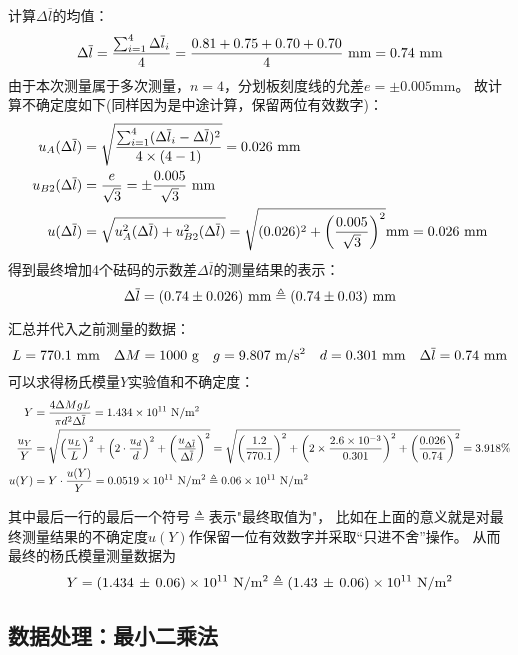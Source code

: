 \documentclass[11pt]{article}
\begin{document}
计算$\Delta \overline l$的均值：
\[
   \Delta \overline l=\frac{\sum_{i=1}^4\Delta \overline l_i}{4}=\frac{0.81+0.75+0.70+0.70}{4}\,\,{\rm mm}=0.74 \,\, {\rm mm} 
\]
由于本次测量属于多次测量，$n=4$，分划板刻度线的允差$e=\pm 0.005$mm。
故计算不确定度如下(同样因为是中途计算，保留两位有效数字)：
\begin{align*}
     u_A(\Delta \overline l)&=\sqrt{\frac{\sum_{i=1}^4(\Delta \overline l_i-\Delta \overline l)^2}{4\times(4-1)}}=0.026\,\,{\rm mm}\\
     u_{B2}(\Delta \overline l)&=\frac{e}{\sqrt 3}=\pm \frac{0.005}{\sqrt 3} \,\,{\rm mm}\\
     u(\Delta \overline l)&=
    \sqrt{u_{A}^2(\Delta \overline l)+u^2_{B2}(\Delta \overline l)} =\sqrt{(0.026)^2+\left(\frac{0.005}{\sqrt3 }\right)^2}{\rm mm}
    =0.026 \,\,{\rm mm}
\end{align*}
得到最终增加4个砝码的示数差$\Delta \overline l$的测量结果的表示：
\[
   \Delta \overline l= (0.74\pm 0.026)\,\,{\rm mm}\triangleq (0.74\pm 0.03)\,\,{\rm mm}
\]


汇总并代入之前测量的数据：
\[
    L=770.1\,\,{\rm mm} \quad \Delta M=1000\,\,{\rm g}\quad 
    g=9.807\,\,{\rm m/s^2}\quad d=0.301\,\,{\rm mm}
    \quad  \Delta\overline l=0.74\,\,{\rm mm}
\]
可以求得杨氏模量$Y$实验值和不确定度：
\begin{align*}
     Y&=\frac{4\Delta M gL}{\pi d^2\Delta \overline l}=1.434\times 10^{11}\,\,{\rm N/m^2}\\
    \frac{u_Y}{Y}&=\sqrt{\left(\frac{u_L}{L}\right)^2
    +\left(2\cdot\frac{u_d}{d}\right)^2+\left(\frac{u_{\Delta \overline l}}{\Delta \overline l}\right)^2}
    =\sqrt{\left(\frac{1.2}{770.1}\right)^2
    +\left(2\times\frac{ 2.6\times 10^{-3}}{0.301}\right)^2+\left(\frac{0.026}{0.74}\right)^2}=3.918\%
    \\ u(Y)&=Y\cdot\frac{u(Y)}{Y}=0.0519\times 10^{11}\,\,{\rm N/m^2}\triangleq0.06\times10^{11}\,\,{\rm N/m^2}
\end{align*}

其中最后一行的最后一个符号$\triangleq$表示"最终取值为"，
比如在上面的意义就是对最终测量结果的不确定度$u(Y)$作保留一位有效数字并采取“只进不舍”操作。
从而最终的杨氏模量测量数据为
\[
    Y=(1.434\,\pm\,0.06) \times10^{11}\,\,{\rm N/m^2}\triangleq (1.43\,\pm \,0.06)\times10^{11}\,\,{\rm N/m^2}
\]



\subsection{数据处理：最小二乘法}
\end{document}
